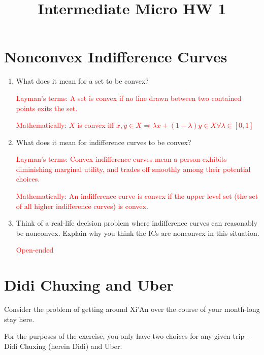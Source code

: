 \documentclass{article}
\begin{document}
\title{Intermediate Micro HW 1}

\maketitle

\section{Nonconvex Indifference Curves}

\begin{enumerate}
\item What does it mean for a set to be convex?

\textcolor{red}{%
Layman's terms: A set is convex if no line drawn between two contained points exits the set.%
}

\textcolor{red}{%
Mathematically: $X$ is convex iff $x,y\in X \Rightarrow \lambda x + (1-\lambda) y \in X \forall \lambda \in [0,1]$%
}

\item What does it mean for indifference curves to be convex?

\textcolor{red}{%
Layman's terms: Convex indifference curves mean a person exhibits diminishing marginal utility, and trades off smoothly among their potential choices.%
}

\textcolor{red}{%
Mathematically: An indifference curve is convex if the upper level set (the set of all higher indifference curves) is convex.%
}

\item Think of a real-life decision problem where indifference curves can reasonably be nonconvex. Explain why you think the ICs are nonconvex in this situation.

\textcolor{red}{Open-ended}

\end{enumerate}

\section{Didi Chuxing and Uber}
Consider the problem of getting around Xi'An over the course of your month-long stay here.

For the purposes of the exercise, you only have two choices for any given trip -- Didi Chuxing (herein Didi) and Uber. 
\end{document}
